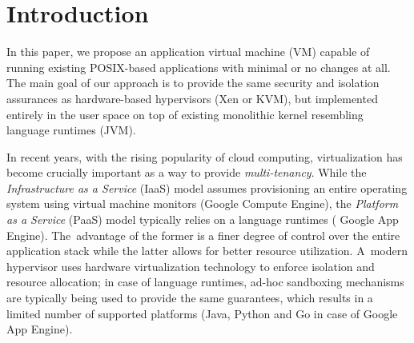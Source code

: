 \section{Introduction}
\label{sec:intro}



In this paper, we propose an application virtual machine (VM) capable of
running existing POSIX-based applications with minimal or no changes at
all. The main goal of our approach is to provide the same security and
isolation assurances as hardware-based hypervisors (\eg Xen or KVM), but
implemented entirely in the user space on top of existing monolithic
kernel resembling language runtimes (\eg JVM).
 
In recent years, with the rising popularity of cloud computing,
virtualization has become crucially important as a way to provide
\emph{multi-tenancy}. While the \emph{Infrastructure as a Service} (IaaS)
model assumes provisioning an entire operating system using virtual
machine monitors (\eg Google Compute Engine), the \emph{Platform as a
Service} (PaaS) model typically relies on a language runtimes (\eg
Google App Engine). The~advantage of the former is a finer degree of
control over the entire application stack while the latter allows for
better resource utilization. A~modern hypervisor uses hardware
virtualization technology to enforce isolation and resource allocation;
in case of language runtimes, ad-hoc sandboxing mechanisms are typically
being used to provide the same guarantees, which results in a limited
number of supported platforms (\eg Java, Python and Go in case of Google
App Engine).



